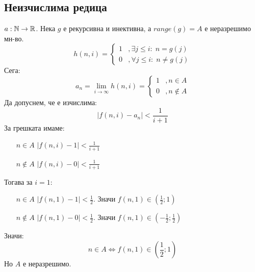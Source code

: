 \subsection{Неизчислима редица}
\begin{example}
    $a: {\mathbb{N}} \to {\mathbb{R}}$. Нека $g$ е рекурсивна и инективна, а $range(g) = A$ е неразрешимо мн-во.
    \begin{equation*}
        h(n, i) = \begin{cases}
            1 &, \exists j \leq i:\; n = g(j) \\
            0 &, \forall j \leq i:\; n \neq g(j)
        \end{cases}
    \end{equation*}
    Сега:
    \begin{equation*}
        a_n = \lim\limits_{i \to \infty} h(n, i) = \begin{cases}
            1 &, n \in A \\
            0 &, n \notin A 
        \end{cases}
    \end{equation*}
    Да допуснем, че е изчислима:
    \begin{equation*}
        |f(n, i) - a_n| < \frac{1}{i+1}
    \end{equation*}
    За грешката имаме:
    \begin{itemize}
        \item[$n \in A$] $|f(n, i) - 1| < \frac{1}{i+1}$
        \item[$n \notin A$] $|f(n, i) - 0| < \frac{1}{i+1}$
    \end{itemize}
    Тогава за $i=1$:
    \begin{itemize}
        \item[$n \in A$] $|f(n, 1) - 1| < \frac{1}{2}$. Значи $f(n, 1) \in \left(\frac{1}{2}; 1\right)$
        \item[$n \notin A$] $|f(n, 1) - 0| < \frac{1}{2}$. Значи $f(n, 1) \in \left(-\frac{1}{2}; \frac{1}{2}\right)$
    \end{itemize}
    Значи:
    \begin{equation*}
        n \in A \iff f(n, 1) \in (\frac{1}{2}; 1)
    \end{equation*}
    Но $A$ е неразрешимо. 
\end{example}
